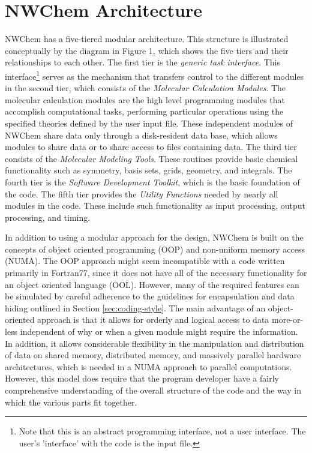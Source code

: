 \section{NWChem Architecture}
\label{sec:arch}

NWChem has a five-tiered modular architecture.  This structure is illustrated
conceptually by the diagram in Figure 1, which shows the five tiers and their
relationships to each other.
The first tier is the {\em generic task interface}.  This interface\footnote{Note that
this is an abstract programming interface, not a user interface.  The user's
'interface' with the code is the input file.} serves as the
mechanism that transfers control to the different modules in the second tier,
which consists of the {\em Molecular Calculation Modules}.
The molecular calculation modules are the high level programming
modules that accomplish computational tasks, performing particular operations
using the specified theories defined by the user input file.  These independent modules
of NWChem share data only through a disk-resident data base,
which allows modules to share data or to share access to files containing
data.
The third tier consists of the {\em Molecular
Modeling Tools}.  These routines provide basic chemical functionality such as symmetry,
basis sets, grids, geometry, and integrals.
The fourth tier is
the {\em Software
Development Toolkit}, which is the basic foundation of the code.
The fifth tier provides the {\em Utility Functions} needed by nearly all modules
in the code.  These include such functionality as input processing, output processing,
and timing.

In addition to using a modular approach for the design, NWChem is built 
on the concepts of object oriented programming (OOP) and non-uniform memory
access (NUMA).  The OOP approach might seem incompatible with a code written primarily
in Fortran77, since it does not
have all of the necessary functionality for an object oriented language (OOL).
However, many of the required features can be simulated by careful adherence
to the guidelines for encapsulation and data hiding outlined
in Section \ref{sec:coding-style}.
The main advantage of an object-oriented approach is that it 
allows for orderly and logical access
to data more-or-less independent of why or when a given module might require
the information.  In addition, it allows considerable flexibility in the 
manipulation and
distribution of data on shared memory, distributed memory, and massively
parallel hardware architectures, which is needed in a NUMA approach to parallel
computations.  However, this model does require that the program
developer have a fairly comprehensive understanding of the overall structure
of the code and the way in which the various parts fit together.

